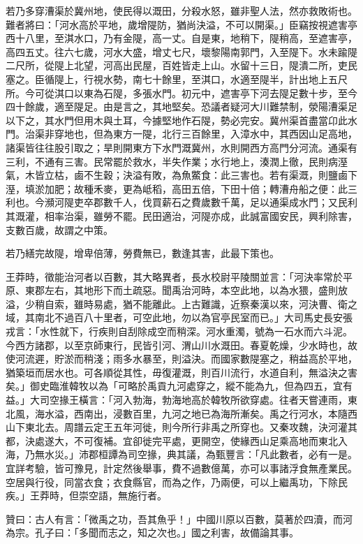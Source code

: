 \begin{pinyinscope}
若乃多穿漕渠於冀州地，使民得以溉田，分殺水怒，雖非聖人法，然亦救敗術也。難者將曰：「河水高於平地，歲增隄防，猶尚決溢，不可以開渠。」臣竊按視遮害亭西十八里，至淇水口，乃有金隄，高一丈。自是東，地稍下，隄稍高，至遮害亭，高四五丈。往六七歲，河水大盛，增丈七尺，壞黎陽南郭門，入至隄下。水未踰隄二尺所，從隄上北望，河高出民屋，百姓皆走上山。水留十三日，隄潰二所，吏民塞之。臣循隄上，行視水勢，南七十餘里，至淇口，水適至隄半，計出地上五尺所。今可從淇口以東為石隄，多張水門。初元中，遮害亭下河去隄足數十步，至今四十餘歲，適至隄足。由是言之，其地堅矣。恐議者疑河大川難禁制，滎陽漕渠足以下之，其水門但用木與土耳，今據堅地作石隄，勢必完安。冀州渠首盡當卬此水門。治渠非穿地也，但為東方一隄，北行三百餘里，入漳水中，其西因山足高地，諸渠皆往往股引取之；旱則開東方下水門溉冀州，水則開西方高門分河流。通渠有三利，不通有三害。民常罷於救水，半失作業；水行地上，湊潤上徹，民則病溼氣，木皆立枯，鹵不生穀；決溢有敗，為魚鱉食：此三害也。若有渠溉，則鹽鹵下溼，填淤加肥；故種禾麥，更為岻稻，高田五倍，下田十倍；轉漕舟船之便：此三利也。今瀕河隄吏卒郡數千人，伐買薪石之費歲數千萬，足以通渠成水門；又民利其溉灌，相率治渠，雖勞不罷。民田適治，河隄亦成，此誠富國安民，興利除害，支數百歲，故謂之中策。

若乃繕完故隄，增卑倍薄，勞費無已，數逢其害，此最下策也。

王莽時，徵能治河者以百數，其大略異者，長水校尉平陵關並言：「河決率常於平原、東郡左右，其地形下而土疏惡。聞禹治河時，本空此地，以為水猥，盛則放溢，少稍自索，雖時易處，猶不能離此。上古難識，近察秦漢以來，河決曹、衛之域，其南北不過百八十里者，可空此地，勿以為官亭民室而已。」大司馬史長安張戎言：「水性就下，行疾則自刮除成空而稍深。河水重濁，號為一石水而六斗泥。今西方諸郡，以至京師東行，民皆引河、渭山川水溉田。春夏乾燥，少水時也，故使河流遲，貯淤而稍淺；雨多水暴至，則溢決。而國家數隄塞之，稍益高於平地，猶築垣而居水也。可各順從其性，毋復灌溉，則百川流行，水道自利，無溢決之害矣。」御史臨淮韓牧以為「可略於禹貢九河處穿之，縱不能為九，但為四五，宜有益。」大司空掾王橫言：「河入勃海，勃海地高於韓牧所欲穿處。往者天嘗連雨，東北風，海水溢，西南出，浸數百里，九河之地已為海所漸矣。禹之行河水，本隨西山下東北去。周譜云定王五年河徙，則今所行非禹之所穿也。又秦攻魏，決河灌其都，決處遂大，不可復補。宜卻徙完平處，更開空，使緣西山足乘高地而東北入海，乃無水災。」沛郡桓譚為司空掾，典其議，為甄豐言：「凡此數者，必有一是。宜詳考驗，皆可豫見，計定然後舉事，費不過數億萬，亦可以事諸浮食無產業民。空居與行役，同當衣食；衣食縣官，而為之作，乃兩便，可以上繼禹功，下除民疾。」王莽時，但崇空語，無施行者。

贊曰：古人有言：「微禹之功，吾其魚乎！」中國川原以百數，莫著於四瀆，而河為宗。孔子曰：「多聞而志之，知之次也。」國之利害，故備論其事。


\end{pinyinscope}